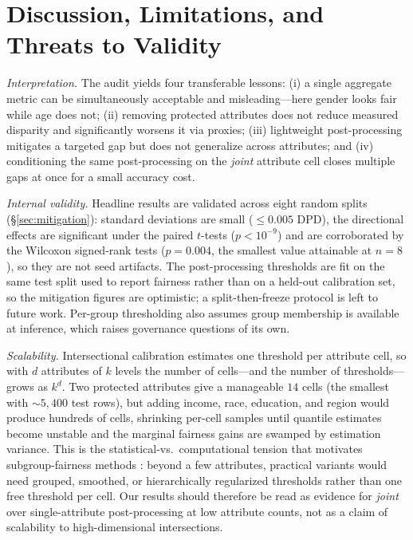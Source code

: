 \documentclass[conference]{IEEEtran}
\begin{document}
\section{Discussion, Limitations, and Threats to Validity}\label{sec:discussion}
\textit{Interpretation.} The audit yields four transferable lessons: (i) a single
aggregate metric can be simultaneously acceptable and misleading---here gender looks
fair while age does not; (ii) removing protected attributes does not reduce measured disparity and
significantly worsens it via proxies; (iii) lightweight post-processing mitigates a targeted gap
but does not generalize across attributes; and (iv) conditioning the same post-processing
on the \emph{joint} attribute cell closes multiple gaps at once for a small accuracy cost.

\textit{Internal validity.} Headline results are validated across eight random splits
(\S\ref{sec:mitigation}): standard deviations are small ($\leq0.005$ DPD), the
directional effects are significant under the paired $t$-tests ($p<10^{-9}$) and are
corroborated by the Wilcoxon signed-rank tests ($p=0.004$, the smallest value
attainable at $n=8$), so they are not seed artifacts. The post-processing thresholds
are fit on the same test split used to report fairness rather than on a held-out
calibration set, so the mitigation figures are optimistic; a split-then-freeze protocol
is left to future work. Per-group thresholding also assumes group membership is
available at inference, which raises governance questions of its own.

\textit{Scalability.} Intersectional calibration estimates one threshold per attribute
cell, so with $d$ attributes of $k$ levels the number of cells---and the number of
thresholds---grows as $k^{d}$. Two protected attributes give a manageable $14$ cells (the
smallest with ${\sim}5{,}400$ test rows), but adding income, race, education, and region
would produce hundreds of cells, shrinking per-cell samples until quantile estimates
become unstable and the marginal fairness gains are swamped by estimation variance. This
is the statistical-vs.\ computational tension that motivates subgroup-fairness methods
\cite{kearns2018gerrymandering}: beyond a few attributes, practical variants would need
grouped, smoothed, or hierarchically regularized thresholds rather than one free threshold
per cell. Our results should therefore be read as evidence for \emph{joint} over
single-attribute post-processing at low attribute counts, not as a claim of scalability to
high-dimensional intersections.
\end{document}
